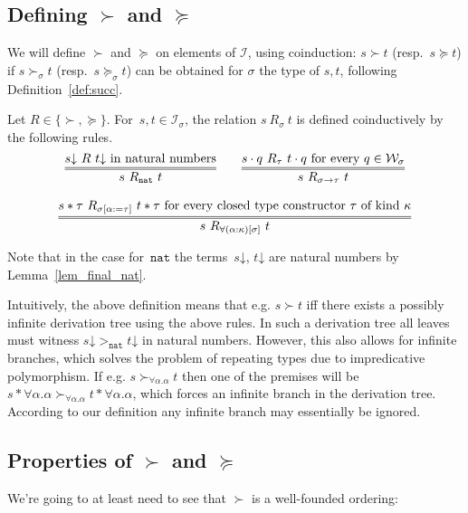 \documentclass[runningheads,a4paper]{llncs}
\newcommand{\Iterms}{\mathcal{I}}
\newcommand{\World}{\mathcal{W}}
\newcommand{\arrtype}{\rightarrow}
\newcommand{\app}[2]{#1 \cdot #2}
\newcommand{\tapp}[2]{#1 * #2}
\newcommand{\subst}[2]{#1:=#2}
\newcommand{\nat}{\mathtt{nat}}
\newcommand{\da}{\mathord{\downarrow}}
\begin{document}
\subsection{Defining $\succ$ and $\succeq$}

We will define $\succ$ and $\succeq$ on elements of $\Iterms$, using
coinduction: $s \succ t$ (resp.\ $s \succeq t$) if $s \succ_\sigma t$
(resp.\ $s \succeq_\sigma t$) can be obtained for $\sigma$ the type of
$s,t$, following Definition~\ref{def:succ}.

\begin{definition}\label{def:succ}
  Let $R \in \{ \succ,\succeq \}$. For~$s,t \in \Iterms_\sigma$, the
  relation $s\ R_{\sigma}\ t$ is defined coinductively by the
  following rules.
  \[
    \begin{array}{c}
    \infer={s\ R_\nat\ t}{s\da\ R\ t\da \text{ in natural
        numbers}}\quad\quad
    \infer={s\ R_{\sigma\arrtype\tau}\ t}{\app{s}{q}\ R_{\tau}\ \app{t}{q}
      \text{ for every } q \in \World_\sigma} \\ \\
    \infer={s\ R_{\forall(\alpha:\kappa)[\sigma]}\ t}{\tapp{s}{\tau}\ R_{\sigma[\subst{\alpha}{\tau}]}\ \tapp{t}{\tau}
      \text{ for every closed type constructor } \tau \text{ of kind }
      \kappa}
    \end{array}
  \]
\end{definition}

Note that in the case for~$\nat$ the terms~$s\da$, $t\da$ are natural
numbers by Lemma~\ref{lem_final_nat}.

Intuitively, the above definition means that e.g. $s \succ t$ iff
there exists a possibly infinite derivation tree using the above
rules. In such a derivation tree all leaves must witness
$s\da >_\nat t\da$ in natural numbers. However, this also allows for
infinite branches, which solves the problem of repeating types due to
impredicative polymorphism. If e.g.
$s \succ_{\forall \alpha . \alpha} t$ then one of the premises will be
$\tapp{s}{\forall\alpha.\alpha} \succ_{\forall \alpha . \alpha}
\tapp{t}{\forall\alpha.\alpha}$, which forces an infinite branch in
the derivation tree. According to our definition any infinite branch
may essentially be ignored.

\subsection{Properties of $\succ$ and $\succeq$}

We're going to at least need to see that $\succ$ is a well-founded
ordering:
\end{document}
